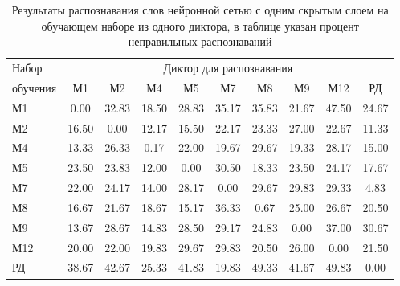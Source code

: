 \begin{table}[h]
	\centering
	\caption{Результаты распознавания слов нейронной сетью с одним скрытым слоем на обучающем наборе из одного диктора, в таблице указан процент неправильных распознаваний}
	\label{tab:mlp1_dictor1}
	\begin{tabular}{| l | c | c | c | c | c | c | c | c | c |}
		\hline
		Набор & \multicolumn{9}{c|}{Диктор для распознавания} \\
		\hhline{~---------}
		обучения \phantom{0000} & М1    & М2    & М4    & М5    & М7    & М8    & М9    & М12   & РД \\
		\hline
		М1		 &  0.00 & 32.83 & 18.50 & 28.83 & 35.17 & 35.83 & 21.67 & 47.50 & 24.67 \\
		М2		 & 16.50 &  0.00 & 12.17 & 15.50 & 22.17 & 23.33 & 27.00 & 22.67 & 11.33 \\
		М4		 & 13.33 & 26.33 &  0.17 & 22.00 & 19.67 & 29.67 & 19.33 & 28.17 & 15.00 \\
		М5		 & 23.50 & 23.83 & 12.00 &  0.00 & 30.50 & 18.33 & 23.50 & 24.17 & 17.67 \\
		М7		 & 22.00 & 24.17 & 14.00 & 28.17 &  0.00 & 29.67 & 29.83 & 29.33 &  4.83 \\
		М8		 & 16.67 & 21.67 & 18.67 & 15.17 & 36.33 &  0.67 & 25.00 & 26.67 & 20.50 \\
		М9		 & 13.67 & 28.67 & 14.83 & 28.50 & 29.17 & 24.83 &  0.00 & 37.00 & 30.67 \\
		М12		 & 20.00 & 22.00 & 19.83 & 29.67 & 29.83 & 20.50 & 26.00 &  0.00 & 21.50 \\
		РД		 & 38.67 & 42.67 & 25.33 & 41.83 & 19.83 & 49.33 & 41.67 & 49.83 &  0.00 \\
		\hline
	\end{tabular}
\end{table}

